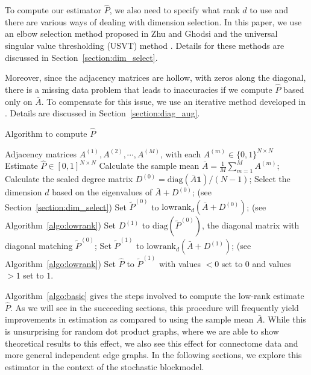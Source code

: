 \documentclass[10pt,letterpaper]{article}
\renewcommand{\hat}{\widehat}
\begin{document}
To compute our estimator $\hat{P}$, we also need to specify what rank $d$ to use and there are various ways of dealing with dimension selection. 
In this paper, we use an elbow selection method proposed in Zhu and Ghodsi \cite{zhu2006automatic} and the universal singular value thresholding (USVT) method \cite{chatterjee2015matrix}. 
Details for these methods are discussed in Section~\ref{section:dim_select}.

Moreover, since the adjacency matrices are hollow, with zeros along the diagonal, there is a missing data problem that leads to inaccuracies if we compute $\hat{P}$ based only on $\bar{A}$. 
To compensate for this issue, we use an iterative method developed in \cite{scheinerman2010modeling}. 
Details are discussed in Section~\ref{section:diag_aug}.


\begin{algorithm}[H]
\caption{Algorithm to compute $\hat{P}$}
\label{algo:basic}
\begin{algorithmic}[1]
\REQUIRE Adjacency matrices $A^{(1)}, A^{(2)}, \cdots, A^{(M)}$, with each $A^{(m)} \in \{0,1\}^{N \times N}$
\ENSURE Estimate $\hat{P}\in[0,1]^{N\times N}$
\STATE Calculate the sample mean $\bar{A} = \frac{1}{M}\sum\limits_{m = 1}^M A^{(m)}$;
\STATE Calculate the scaled degree matrix $D^{(0)} = \mathrm{diag}(\bar{A} \bm{1})/(N-1)$;
\STATE Select the dimension $d$ based on the eigenvalues of $\bar{A} + D^{(0)}$; (see Section~\ref{section:dim_select})
\STATE Set $\tilde{P}^{(0)}$ to $\mathrm{lowrank}_d(\bar{A} + D^{(0)})$; (see Algorithm~\ref{algo:lowrank})
\STATE Set $D^{(1)}$ to $ \mathrm{diag}(\tilde{P}^{(0)})$, the diagonal matrix with diagonal matching $\tilde{P}^{(0)}$; 
\STATE Set $\tilde{P}^{(1)}$ to $\mathrm{lowrank}_d(\bar{A} + D^{(1)})$; (see Algorithm~\ref{algo:lowrank})
\STATE Set $\hat{P}$ to $\tilde{P}^{(1)}$ with values $<0$ set to $0$ and values $>1$ set to $1$.
\end{algorithmic}
\end{algorithm}


Algorithm~\ref{algo:basic} gives the steps involved to compute the low-rank estimate $\hat{P}$.
As we will see in the succeeding sections, this procedure will frequently yield improvements in estimation as compared to using the sample mean $\bar{A}$.
While this is unsurprising for random dot product graphs, where we are able to show theoretical results to this effect, we also see this effect for connectome data and more general independent edge graphs.
In the following sections, we explore this estimator in the context of the stochastic blockmodel.
\end{document}
